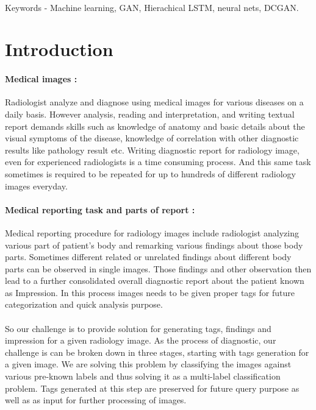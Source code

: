 \documentclass[12pt]{article}
\numberwithin{figure}{section}
\begin{document}
\\
Keywords - Machine learning, GAN, Hierachical LSTM, neural nets, DCGAN.
\\
\clearpage
\tableofcontents
\clearpage
\listoffigures 
\listoftables
\clearpage
{}
\section{Introduction}
\paragraph{Medical images : }
Radiologist analyze and diagnose using medical images for various diseases on a daily basis. However analysis, reading and interpretation, and writing textual report demands skills such as knowledge of anatomy and basic details about the visual symptoms of the disease, knowledge of correlation with other diagnostic results like pathology result etc.
Writing diagnostic report for radiology image, even for experienced radiologists is a time consuming process. And this same task sometimes is required to be repeated for up to hundreds of different radiology images everyday.
\paragraph{Medical reporting task and parts of report : }
Medical reporting procedure for radiology images include radiologist analyzing various part of patient’s body and remarking various findings about those body parts. Sometimes different related or unrelated findings about different body parts can be observed in single images. Those findings and other observation then lead to a further consolidated overall diagnostic report about the patient known as Impression. In this process images needs to be given proper tags for future categorization and quick analysis purpose.
\paragraph{}
So our challenge is to provide solution for generating tags, findings and impression for a given radiology image. As the process of diagnostic, our challenge is can be broken down in three stages, starting with tags generation for a given image. We are solving this problem by classifying the images against various pre-known labels and thus solving it as a multi-label classification problem. Tags generated at this step are preserved for future query purpose as well as as input for further processing of images. 
\end{document}
